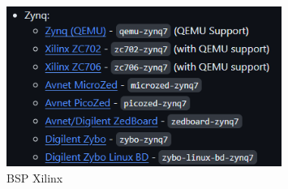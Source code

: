 \documentclass[12pt,letterpaper]{article}
\begin{document}
\begin{figure}[h!]
    \centering
    \includegraphics[width=0.8\textwidth]{images/image01.png}
    \caption{BSP Xilinx}
    \label{fig:Entorno}
  \end{figure}

%
%
\end{document}
